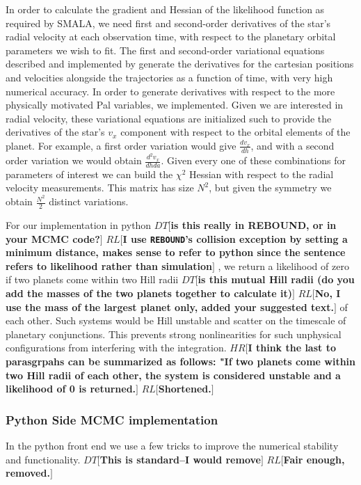 \documentclass{aa}
\def\memohr#1{\color{blue}$HR[${\bf #1}$]$ \color{black}}
\def\memodt#1{\color{green}$DT[${\bf #1}$]$ \color{black}}
\def\memorl#1{\color{gray}$RL[${\bf #1}$]$ \color{black}}
\newcommand{\reb}{{\sc \tt REBOUND}\xspace}
\begin{document}
In order to calculate the gradient and Hessian of the likelihood function as required by SMALA, we need first and second-order derivatives of the star's radial velocity at each observation time, with respect to the planetary orbital parameters we wish to fit.  
The first and second-order variational equations described and implemented by \cite{Rein2016} generate the derivatives for the cartesian positions and velocities alongside the trajectories as a function of time, with very high numerical accuracy. In order to generate derivatives with respect to the more physically motivated Pal variables, we implemented.
Given we are interested in radial velocity, these variational equations are initialized such to provide the derivatives of the star's $v_x$ component with respect to the orbital elements of the planet.
For example, a first order variation would give $\frac{dv_x}{dh}$, and with a second order variation we would obtain $\frac{d^2v_x}{dhda}$. 
Given every one of these combinations for parameters of interest we can build the $\chi^2$ Hessian with respect to the radial velocity measurements. This matrix has size $N^2$, but given the symmetry we obtain $\frac{N^2}{2}$ distinct variations.

For our implementation in python \memodt{is this really in REBOUND, or in your MCMC code?}\memorl{I use \reb's collision exception by setting a minimum distance, makes sense to refer to python since the sentence refers to likelihood rather than simulation}, we return a likelihood of zero if two planets come within two Hill radii \memodt{is this mutual Hill radii (do you add the masses of the two planets together to calculate it)}\memorl{No, I use the mass of the largest planet only, added your suggested text.} of each other. 
Such systems would be Hill unstable \cite{Gladman1993} and scatter on the timescale of planetary conjunctions. This prevents strong nonlinearities for such unphysical configurations from interfering with the integration.
\memohr{I think the last to parasgrpahs can be summarized as follows: "If two planets come within two Hill radii of each other, the system is considered unstable and a likelihood of 0 is returned.}
\memorl{Shortened.}

\subsubsection{Python Side MCMC implementation}
In the python front end we use a few tricks to improve the numerical stability and functionality.
\memodt{This is standard--I would remove} \memorl{Fair enough, removed.}
\end{document}

